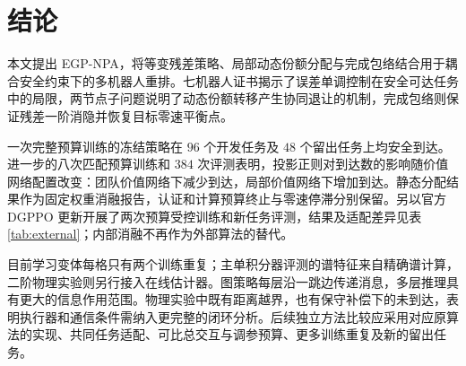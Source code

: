 \section{结论}\label{sec:conclusion}
本文提出 EGP-NPA，将等变残差策略、局部动态份额分配与完成包络结合用于耦合安全约束下的多机器人重排。七机器人证书揭示了误差单调控制在安全可达任务中的局限，两节点子问题说明了动态份额转移产生协同退让的机制，完成包络则保证残差一阶消隐并恢复目标零速平衡点。

一次完整预算训练的冻结策略在 $96$ 个开发任务及 $48$ 个留出任务上均安全到达。进一步的八次匹配预算训练和 $384$ 次评测表明，投影正则对到达数的影响随价值网络配置改变：团队价值网络下减少到达，局部价值网络下增加到达。静态分配结果作为固定权重消融报告，认证和计算预算终止与零速停滞分别保留。另以官方 DGPPO 更新开展了两次预算受控训练和新任务评测，结果及适配差异见表\ref{tab:external}；内部消融不再作为外部算法的替代。

目前学习变体每格只有两个训练重复；主单积分器评测的谱特征来自精确谱计算，二阶物理实验则另行接入在线估计器。图策略每层沿一跳边传递消息，多层推理具有更大的信息作用范围。物理实验中既有距离越界，也有保守补偿下的未到达，表明执行器和通信条件需纳入更完整的闭环分析。后续独立方法比较应采用对应原算法的实现、共同任务适配、可比总交互与调参预算、更多训练重复及新的留出任务。
